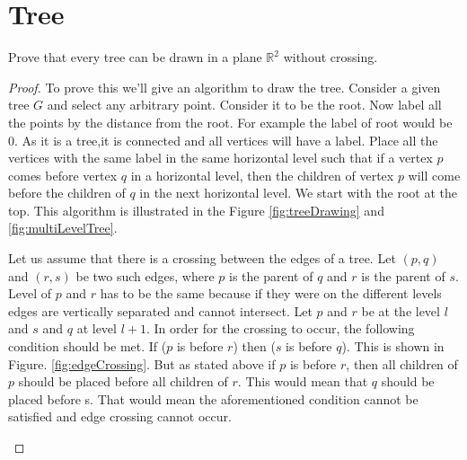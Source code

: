 \documentclass{article}
\def\R{\mathbb{R}}
\begin{document}
\section{Tree}
\begin{theorem}
  Prove that every tree can be drawn in a plane $\R^2$  without crossing.
  \end{theorem}
      \begin{proof}
 To prove this we'll give an algorithm to draw the tree. Consider a given tree $G$ and select any arbitrary point. Consider it to be the root. Now label all the points by the distance from the root. For example the label of root would be 0. As it is a tree,it is connected and all vertices will have a label. Place all the vertices with the same label in the same horizontal level such that if a vertex $p$ comes before vertex $q$ in a horizontal level, then the children of vertex $p$ will come before the children of $q$ in the next horizontal level. We start with the root at the top. This algorithm is illustrated in the Figure \ref{fig:treeDrawing} and \ref{fig:multiLevelTree}.

Let us assume that there is a crossing between the edges of a tree. Let $(p,q)$ and $(r,s)$ be two such edges, where $p$ is the parent of $q$ and $r$ is the parent of $s$. Level of $p$ and $r$ has to be the same because if they were on the different levels edges are vertically separated and cannot intersect. Let $p$ and $r$ be at the level $l$ and $s$ and $q$ at level $l+1$. In order for the crossing to occur, the following condition should be met. If ($p$ is before $r$) then ($s$ is before $q$). This is shown in Figure. \ref{fig:edgeCrossing}. But as stated above if $p$ is before $r$, then all children of $p$ should be placed before all children of $r$. This would mean that $q$ should be placed before s. That would mean the aforementioned condition cannot be satisfied and edge crossing cannot occur.
          \begin{figure}[h!]
\begin{center}

    
    \begin{tikzpicture}[x=0.75pt,y=0.75pt,yscale=-1,xscale=1]
    

\end{tikzpicture}
\end{center}
\end{figure}
\end{proof}
\end{document}
